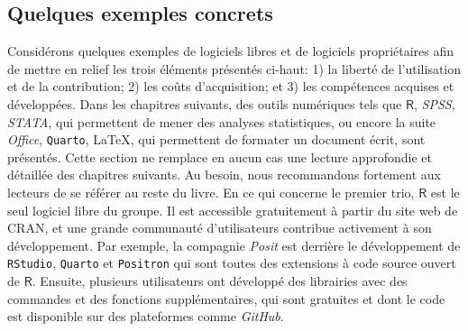 \documentclass[
  letterpaper,
  DIV=11,
  numbers=noendperiod,
  oneside]{scrreprt}
\begin{document}
\hypertarget{quelques-exemples-concrets}{%
\subsection{Quelques exemples
concrets}\label{quelques-exemples-concrets}}

Considérons quelques exemples de logiciels libres et de logiciels
propriétaires afin de mettre en relief les trois éléments présentés
ci-haut: 1) la liberté de l'utilisation et de la contribution; 2) les
coûts d'acquisition; et 3) les compétences acquises et développées. Dans
les chapitres suivants, des outils numériques tels que \(\textsf{R}\),
\emph{SPSS}, \emph{STATA}, qui permettent de mener des analyses
statistiques, ou encore la suite \emph{Office}, \texttt{Quarto}, \LaTeX,
qui permettent de formater un document écrit, sont présentés. Cette
section ne remplace en aucun cas une lecture approfondie et détaillée
des chapitres suivants. Au besoin, nous recommandons fortement aux
lecteurs de se référer au reste du livre. En ce qui concerne le premier
trio, \(\textsf{R}\) est le seul logiciel libre du groupe. Il est
accessible gratuitement à partir du site web de CRAN, et une grande
communauté d'utilisateurs contribue activement à son développement. Par
exemple, la compagnie \emph{Posit} est derrière le développement de
\texttt{RStudio}, \texttt{Quarto} et \texttt{Positron} qui sont toutes
des extensions à code source ouvert de \(\textsf{R}\). Ensuite,
plusieurs utilisateurs ont développé des librairies avec des commandes
et des fonctions supplémentaires, qui sont gratuites et dont le code est
disponible sur des plateformes comme \emph{GitHub}.
\end{document}
